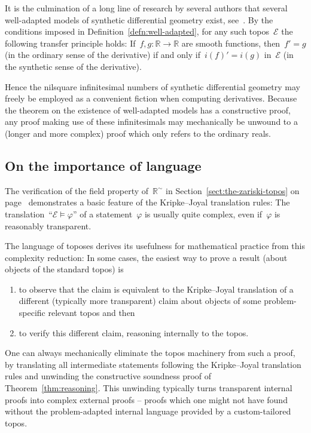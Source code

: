 \documentclass[graybox]{svmult}
\renewcommand{\E}{\mathcal{E}}
\newcommand{\RR}{\mathbb{R}}
\renewcommand{\_}{\mathpunct{.}\,}
\newcommand{\?}{\,{:}\,}
\begin{document}
It is the culmination of a long line of research by several authors that
several well-adapted models of synthetic differential geometry exist, see~\cite{moerdijk-reyes:models}. By the
conditions imposed in Definition~\ref{defn:well-adapted}, for any such
topos~$\E$ the following transfer principle holds: If~$f,g : \RR \to \RR$ are
smooth functions, then~$f' = g$ (in the ordinary sense of the derivative) if
and only if~$i(f)' = i(g)$ in~$\E$ (in the synthetic sense of the derivative).

Hence the nilsquare infinitesimal numbers of synthetic differential geometry
may freely be employed as a convenient fiction when computing derivatives.
Because the theorem on the existence of well-adapted models has a constructive
proof, any proof making use of these infinitesimals may mechanically be
unwound to a (longer and more complex) proof which only refers to the ordinary
reals.


\subsection{On the importance of language} The verification of the field
property of~$\RR^\sim$ in Section~\ref{sect:the-zariski-topos} on
page~\pageref{page:field-property} demonstrates a basic feature of the
Kripke--Joyal translation rules: The translation~``$\E \models \varphi$'' of a
statement~$\varphi$ is usually quite complex, even if~$\varphi$ is reasonably
transparent.

The language of toposes derives its usefulness for mathematical practice from
this complexity reduction: In some cases, the easiest way to prove a result
(about objects of the standard topos) is
\begin{enumerate}
\item to observe that the claim is
equivalent to the Kripke--Joyal translation of a different (typically more
transparent) claim about objects of some problem-specific relevant topos and
then
\item to verify this different claim, reasoning internally to the topos.
\end{enumerate}

One can always mechanically eliminate the topos machinery from such a proof, by
translating all intermediate statements following the Kripke--Joyal translation
rules and unwinding the constructive soundness proof of
Theorem~\ref{thm:reasoning}. This unwinding typically turns transparent
internal proofs into complex external proofs -- proofs which one might not have
found without the problem-adapted internal language provided by a
custom-tailored topos.



\end{document}
